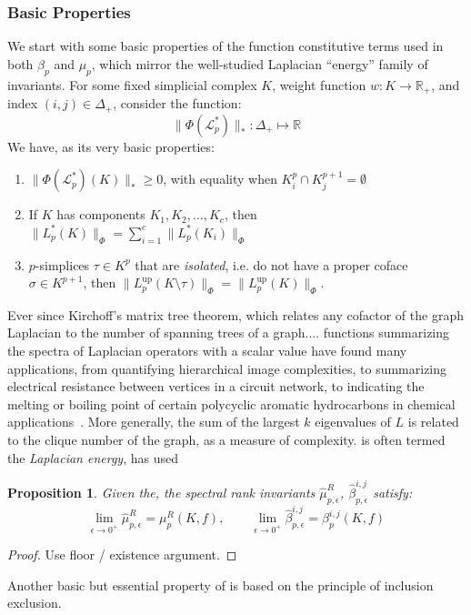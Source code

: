 \documentclass[10pt]{article}
\numberwithin{equation}{section}
\newcommand{\+}{%
	\raisebox{0.18ex}{\scaleobj{0.55}{+}}
}
\newtheorem{proposition}{Proposition}
\theoremstyle{definition}
\theoremstyle{definition}
\begin{document}
\subsubsection*{Basic Properties}
We start with some basic properties of the function constitutive terms used in both $\beta_p$ and $\mu_p$, which mirror the well-studied Laplacian ``energy'' family of invariants. 
For some fixed simplicial complex $K$, weight function $w: K \to \mathbb{R}_+$, and index $(i,j) \in \Delta_+$, consider the function:
$$ \lVert \Phi(\mathcal{L}_p^{\ast}) \rVert_\ast : \Delta_+ \mapsto \mathbb{R}$$
We have, as its very basic properties: 
\begin{enumerate}
	\item $\lVert \Phi(\mathcal{L}_p^{\ast})(K) \rVert_\ast \geq 0$, with equality when $K^p_i \cap K^{p+1}_j = \emptyset$
	\item If $K$ has components $K_1, K_2, \dots, K_c$, then $\lVert L_p^\ast(K)\rVert_{\Phi} = \sum\limits_{i=1}^c \lVert L_p^\ast(K_i)\rVert_{\Phi}$ 
	\item $p$-simplices $\tau \in K^p$ that are \emph{isolated}, i.e. do not have a proper coface $\sigma \in K^{p+1}$, then $\lVert L_p^{\text{up}}(K \setminus \tau)\rVert_{\Phi} =\lVert L_p^{\text{up}}(K)\rVert_{\Phi}$. %
\end{enumerate}
Ever since Kirchoff's matrix tree theorem, which relates any cofactor of the graph Laplacian to the number of spanning trees of a graph.... functions summarizing the spectra of Laplacian operators with a scalar value have found many applications, from quantifying hierarchical image complexities, to summarizing electrical resistance between vertices in a circuit network, to indicating the melting or boiling point of certain polycyclic aromatic hydrocarbons in chemical applications~\cite{}.
More generally, the sum of the largest $k$ eigenvalues of $L$ is related to the clique number of the graph,  as a measure of complexity.
is often termed the \emph{Laplacian energy}, has used  %

\begin{proposition}
Given the, the spectral rank invariants $\hat{\mu}_{p,\epsilon}^R$, $\hat{\beta}_{p,\epsilon}^{i,j}$ satisfy: 
$$ \lim_{\epsilon \to 0^+ }\hat{\mu}_{p,\epsilon}^R = \mu_p^R(K,f), \quad \quad \lim_{\epsilon \to 0^+ } \hat{\beta}_{p,\epsilon}^{i,j} = \beta_{p}^{i,j}(K,f)$$
\end{proposition}
\begin{proof}
	Use floor / existence argument. 
\end{proof}
Another basic but essential property of is based on the principle of inclusion exclusion. 
\end{document}
